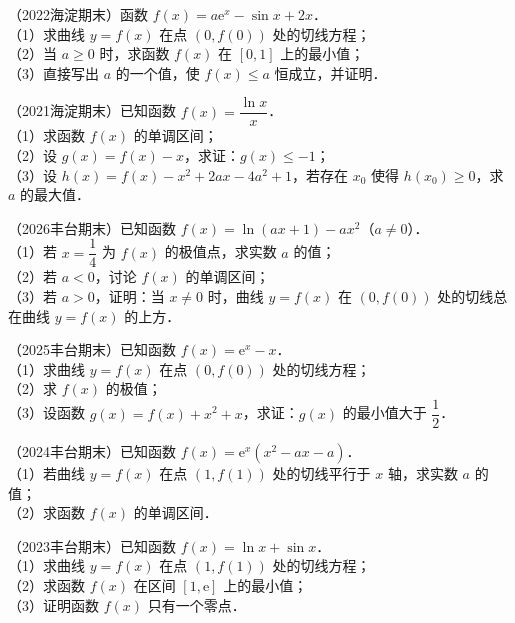 \begin{example}
（2022海淀期末）函数 $f(x)=a\mathrm{e}^x-\sin x+2x$．\\
（1）求曲线 $y=f(x)$ 在点 $(0,f(0))$ 处的切线方程；\\
（2）当 $a\geqslant0$ 时，求函数 $f(x)$ 在 $[0,1]$ 上的最小值；\\
（3）直接写出 $a$ 的一个值，使 $f(x)\leqslant a$ 恒成立，并证明．
\end{example}

\begin{example}
（2021海淀期末）已知函数 $f(x)=\dfrac{\ln x}{x}$．\\
（1）求函数 $f(x)$ 的单调区间；\\
（2）设 $g(x)=f(x)-x$，求证：$g(x)\leqslant-1$；\\
（3）设 $h(x)=f(x)-x^2+2ax-4a^2+1$，若存在 $x_0$ 使得 $h(x_0)\geqslant0$，求 $a$ 的最大值．
\end{example}

\begin{example}
（2026丰台期末）已知函数 $f(x)=\ln(ax+1)-ax^2$（$a\neq0$）．\\
（1）若 $x=\dfrac14$ 为 $f(x)$ 的极值点，求实数 $a$ 的值；\\
（2）若 $a<0$，讨论 $f(x)$ 的单调区间；\\
（3）若 $a>0$，证明：当 $x\neq0$ 时，曲线 $y=f(x)$ 在 $(0,f(0))$ 处的切线总在曲线 $y=f(x)$ 的上方．
\end{example}

\begin{example}
（2025丰台期末）已知函数 $f(x)=\mathrm{e}^x-x$．\\
（1）求曲线 $y=f(x)$ 在点 $(0,f(0))$ 处的切线方程；\\
（2）求 $f(x)$ 的极值；\\
（3）设函数 $g(x)=f(x)+x^2+x$，求证：$g(x)$ 的最小值大于 $\dfrac12$．
\end{example}

\begin{example}
（2024丰台期末）已知函数 $f(x)=\mathrm{e}^x(x^2-ax-a)$．\\
（1）若曲线 $y=f(x)$ 在点 $(1,f(1))$ 处的切线平行于 $x$ 轴，求实数 $a$ 的值；\\
（2）求函数 $f(x)$ 的单调区间．
\end{example}

\begin{example}
（2023丰台期末）已知函数 $f(x)=\ln x+\sin x$．\\
（1）求曲线 $y=f(x)$ 在点 $(1,f(1))$ 处的切线方程；\\
（2）求函数 $f(x)$ 在区间 $[1,\mathrm{e}]$ 上的最小值；\\
（3）证明函数 $f(x)$ 只有一个零点．
\end{example}


